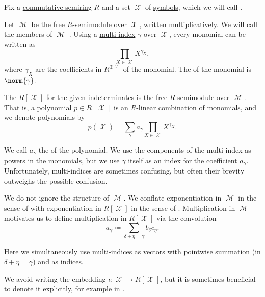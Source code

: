 \begin{definition}\label{def:polynomial_semiring}
  Fix a \hyperref[def:semiring/commutative]{commutative semiring} \( R \) and a set \( \mscrX \) of \hyperref[def:formal_language/symbol]{symbols}, which we will call .

  Let \( \mscrM \) be the \hyperref[def:free_semimodule]{free \( R \)-semimodule} over \( \mscrX \), written \hyperref[rem:additive_magma]{multiplicatively}. We will call the members of \( \mscrM \) . Using a \hyperref[def:multi_index]{multi-index} \( \gamma \) over \( \mscrX \), every monomial can be written as
  \begin{equation*}
    \prod_{X \in \mscrX} X^{\gamma_X},
  \end{equation*}
  where \( \gamma_X \) are the coefficients in \( R^{\oplus \mscrX} \) of the monomial. The  of the monomial is \( \norm{\gamma} \).

  The  \( R[\mscrX] \) for the given indeterminates is the \hyperref[def:free_semimodule]{free \( R \)-semimodule} over \( \mscrM \). That is, a polynomial \( p \in R[\mscrX] \) is an \( R \)-linear combination of monomials, and we denote polynomials by
  \begin{equation*}
    p(\mscrX) = \sum_\gamma a_\gamma \prod_{X \in \mscrX} X^{\gamma_X}.
  \end{equation*}

  We call \( a_\gamma \) the  of the polynomial. We use the components of the multi-index as powers in the monomials, but we use \( \gamma \) itself as an index for the coefficient \( a_\gamma \). Unfortunately, multi-indices are sometimes confusing, but often their brevity outweighs the possible confusion.

  We do not ignore the structure of \( \mscrM \). We conflate exponentiation in \( \mscrM \) in the sense of  with exponentiation in \( R[\mscrX] \) in the sense of . Multiplication in \( \mscrM \) motivates us to define multiplication in \( R[\mscrX] \) via the convolution
  \begin{equation*}
    a_\gamma \coloneqq \sum_{\delta + \eta = \gamma} b_\delta c_\eta.
  \end{equation*}

  Here we simultaneously use multi-indices as vectors with pointwise summation (in \( \delta + \eta = \gamma \)) and as indices.

  We avoid writing the embedding \( \iota: \mscrX \to R[\mscrX] \), but it is sometimes beneficial to denote it explicitly, for example in .
\end{definition}

